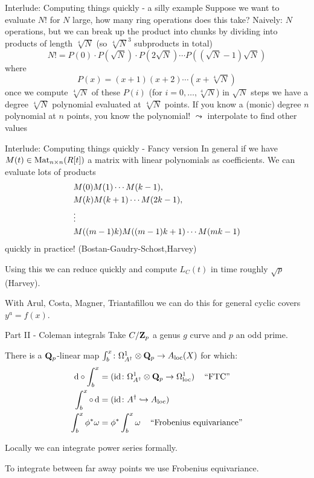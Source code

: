 \begin{frame}{Interlude: Computing things quickly - a silly example}
    Suppose we want to evaluate $N!$ for $N$ large, how many ring operations does this take? \pause
    Naively: $N$ operations, but we can break up the product into chunks by 
    dividing into products of length $\sqrt[4]{N}$ (so $\sqrt[4]{N}^3$ subproducts in total)
    \[ N! = P(0)\cdot P(\sqrt{N})\cdot P(2\sqrt{N})\cdots P((\sqrt{N} - 1)\sqrt N) \]
    where
    \[P(x) = (x + 1)(x+2) \cdots (x+\sqrt[4]{N})\]\pause
    once we compute $\sqrt[4]{N}$ of these $P(i)$ (for $i = 0, \ldots, \sqrt[4]{N}$) in $\sqrt{N}$ steps we have a degree $\sqrt[4]{N}$ polynomial evaluated at $\sqrt[4]{N}$ points. If you know a (monic) degree $n$ polynomial at $n$ points, you know the polynomial! $\leadsto$ interpolate to find other values
\end{frame}

\begin{frame}{Interlude: Computing things quickly - Fancy version}
    In general if we have $M(t)\in \operatorname{Mat}_{n\times n}(R[t])$ a matrix with linear polynomials as coefficients.
    We can evaluate lots of products
    \begin{align*}\amp M(0) M(1) \cdots M(k-1),\\\amp M(k) M(k+1) \cdots M(2k-1),\\\amp\vdots\\\amp M((m-1)k) M((m-1)k+1) \cdots M(mk - 1)\end{align*}\pause
    quickly in practice! (Bostan-Gaudry-Schost,Harvey)\pause

    Using this we can reduce quickly and compute $L_C(t)$ in time roughly $\sqrt p$ (Harvey).

    With Arul, Costa, Magner, Triantafillou we can do this for general cyclic covers $y^a = f(x)$.
\end{frame}

\begin{frame}{Part II - Coleman integrals}
    Take \(C/\mathbf{Z}_p\) a genus \(g\) curve and \(p\) an odd prime.
    \begin{theorem}[{Coleman}]
        There is a \(\mathbf Q_p\)-linear map \(\int_b^x\colon \Omega_{A^\dagger}^1\otimes \mathbf Q_p \to A_\mathrm{loc} (X)\) for which:
        \begin{align*}
            \mathop{}\!\mathrm{d} \circ \int_b^x &= (\mathrm{id}\colon \Omega_{A^\dagger}^1\otimes \mathbf Q_p \to \Omega_{\text{loc}}^1)\,\quad\text{``FTC''}\\
            \int_b^x\circ\mathop{}\!\mathrm{d} & = (\mathrm{id}\colon A^\dagger \hookrightarrow A_{\mathrm{loc}})\\
        \int_b^x \phi^*\omega &= \phi^*\int_b^x \omega\,\quad\text{``Frobenius equivariance''}
        \end{align*}
    \end{theorem}\pause
    Locally we can integrate power series formally.\pause

    To integrate between far away points we use Frobenius equivariance.
\end{frame}

